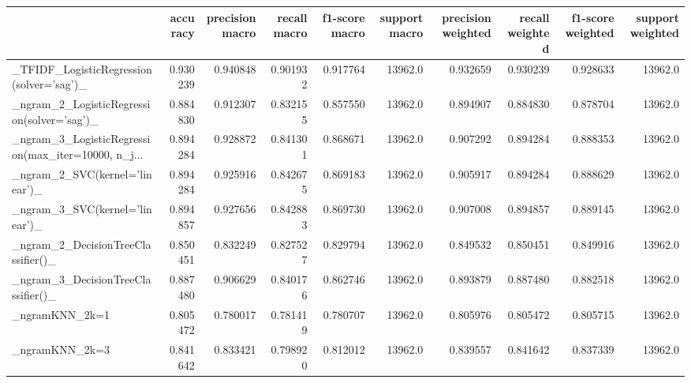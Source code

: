 \begin{tabular}{lrrrrrrrrr}
\toprule
{} &  accuracy &  precision macro &  recall macro &  f1-score macro &  support macro &  precision weighted &  recall weighted &  f1-score weighted &  support weighted \\
\midrule
\_TFIDF\_LogisticRegression(solver='sag')\_           &  0.930239 &         0.940848 &      0.901932 &        0.917764 &        13962.0 &            0.932659 &         0.930239 &           0.928633 &           13962.0 \\
\_ngram\_2\_LogisticRegression(solver='sag')\_         &  0.884830 &         0.912307 &      0.832155 &        0.857550 &        13962.0 &            0.894907 &         0.884830 &           0.878704 &           13962.0 \\
\_ngram\_3\_LogisticRegression(max\_iter=10000, n\_j... &  0.894284 &         0.928872 &      0.841301 &        0.868671 &        13962.0 &            0.907292 &         0.894284 &           0.888353 &           13962.0 \\
\_ngram\_2\_SVC(kernel='linear')\_                     &  0.894284 &         0.925916 &      0.842675 &        0.869183 &        13962.0 &            0.905917 &         0.894284 &           0.888629 &           13962.0 \\
\_ngram\_3\_SVC(kernel='linear')\_                     &  0.894857 &         0.927656 &      0.842883 &        0.869730 &        13962.0 &            0.907008 &         0.894857 &           0.889145 &           13962.0 \\
\_ngram\_2\_DecisionTreeClassifier()\_                 &  0.850451 &         0.832249 &      0.827527 &        0.829794 &        13962.0 &            0.849532 &         0.850451 &           0.849916 &           13962.0 \\
\_ngram\_3\_DecisionTreeClassifier()\_                 &  0.887480 &         0.906629 &      0.840176 &        0.862746 &        13962.0 &            0.893879 &         0.887480 &           0.882518 &           13962.0 \\
\_ngramKNN\_2k=1                                     &  0.805472 &         0.780017 &      0.781419 &        0.780707 &        13962.0 &            0.805976 &         0.805472 &           0.805715 &           13962.0 \\
\_ngramKNN\_2k=3                                     &  0.841642 &         0.833421 &      0.798920 &        0.812012 &        13962.0 &            0.839557 &         0.841642 &           0.837339 &           13962.0 \\

\end{tabular}
